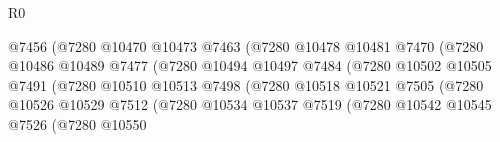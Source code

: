 \begin{lexlean}{R0}
\begin{coremodule}
                                            @7456
                                            (@7280
                                              @10470
                                              @10473
                                              @7463
                                              (@7280
                                                @10478
                                                @10481
                                                @7470
                                                (@7280
                                                  @10486
                                                  @10489
                                                  @7477
                                                  (@7280
                                                    @10494
                                                    @10497
                                                    @7484
                                                    (@7280
                                                      @10502
                                                      @10505
                                                      @7491
                                                      (@7280
                                                        @10510
                                                        @10513
                                                        @7498
                                                        (@7280
                                                          @10518
                                                          @10521
                                                          @7505
                                                          (@7280
                                                            @10526
                                                            @10529
                                                            @7512
                                                            (@7280
                                                              @10534
                                                              @10537
                                                              @7519
                                                              (@7280
                                                                @10542
                                                                @10545
                                                                @7526
                                                                (@7280
                                                                  @10550

\end{coremodule}
\end{lexlean}
